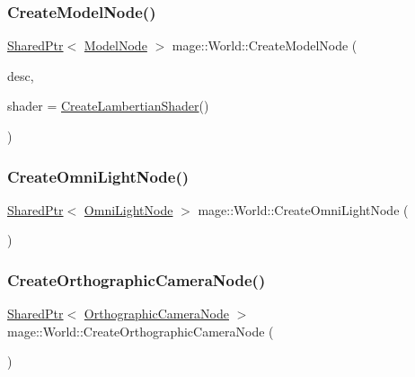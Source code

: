\subsubsection{\texorpdfstring{Create\+Model\+Node()}{CreateModelNode()}}
{\footnotesize\ttfamily \hyperlink{namespacemage_a1e01ae66713838a7a67d30e44c67703e}{Shared\+Ptr}$<$ \hyperlink{namespacemage_a3086b6de2ec7ebd59d8b0bdc57195760}{Model\+Node} $>$ mage\+::\+World\+::\+Create\+Model\+Node (\begin{DoxyParamCaption}\item[{const \hyperlink{classmage_1_1_model_descriptor}{Model\+Descriptor} \&}]{desc,  }\item[{const \hyperlink{structmage_1_1_combined_shader}{Combined\+Shader} \&}]{shader = {\ttfamily \hyperlink{namespacemage_ab0bd21012fa29244f0f9b3201bebc2a5}{Create\+Lambertian\+Shader}()} }\end{DoxyParamCaption})}

\hypertarget{classmage_1_1_world_a82dcc5a90d9d117c5f09144c48618727}{}\label{classmage_1_1_world_a82dcc5a90d9d117c5f09144c48618727} 
\subsubsection{\texorpdfstring{Create\+Omni\+Light\+Node()}{CreateOmniLightNode()}}
{\footnotesize\ttfamily \hyperlink{namespacemage_a1e01ae66713838a7a67d30e44c67703e}{Shared\+Ptr}$<$ \hyperlink{namespacemage_a5d71843ded3749108547eba2a5ce4d85}{Omni\+Light\+Node} $>$ mage\+::\+World\+::\+Create\+Omni\+Light\+Node (\begin{DoxyParamCaption}{ }\end{DoxyParamCaption})}

\hypertarget{classmage_1_1_world_a43b49cea660af139826a2d1b7f832720}{}\label{classmage_1_1_world_a43b49cea660af139826a2d1b7f832720} 
\subsubsection{\texorpdfstring{Create\+Orthographic\+Camera\+Node()}{CreateOrthographicCameraNode()}}
{\footnotesize\ttfamily \hyperlink{namespacemage_a1e01ae66713838a7a67d30e44c67703e}{Shared\+Ptr}$<$ \hyperlink{namespacemage_ab4bde438cc5dd644b0092500df32a83e}{Orthographic\+Camera\+Node} $>$ mage\+::\+World\+::\+Create\+Orthographic\+Camera\+Node (\begin{DoxyParamCaption}{ }\end{DoxyParamCaption})}


